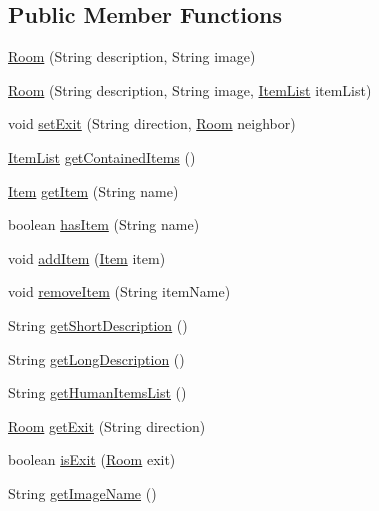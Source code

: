 \subsection*{Public Member Functions}
\begin{DoxyCompactItemize}
\item 
\hyperlink{classpkg__world_1_1Room_ae48ca6830c8c9368ab1cb7e9b006d157}{Room} (String description, String image)
\item 
\hyperlink{classpkg__world_1_1Room_a0f95ea70b403217118bf7d5c1f0aebaf}{Room} (String description, String image, \hyperlink{classpkg__world_1_1ItemList}{Item\-List} item\-List)
\item 
void \hyperlink{classpkg__world_1_1Room_a4a97591f3b574b3d0086843a919a0214}{set\-Exit} (String direction, \hyperlink{classpkg__world_1_1Room}{Room} neighbor)
\item 
\hyperlink{classpkg__world_1_1ItemList}{Item\-List} \hyperlink{classpkg__world_1_1Room_a969205a4d2d2d9e30d1e1db9fc3f0b43}{get\-Contained\-Items} ()
\item 
\hyperlink{classpkg__world_1_1Item}{Item} \hyperlink{classpkg__world_1_1Room_a8624c98bd006830d4484dae2dcd8c8e7}{get\-Item} (String name)
\item 
boolean \hyperlink{classpkg__world_1_1Room_aefa26e1bc5088dd199dde2e9d471c490}{has\-Item} (String name)
\item 
void \hyperlink{classpkg__world_1_1Room_a118585101b274edfdd43b724382de89c}{add\-Item} (\hyperlink{classpkg__world_1_1Item}{Item} item)
\item 
void \hyperlink{classpkg__world_1_1Room_ab84c99b33e69d4a3e0700cab4b9efeaa}{remove\-Item} (String item\-Name)
\item 
String \hyperlink{classpkg__world_1_1Room_adb98ed16e34549faabed35f90673d266}{get\-Short\-Description} ()
\item 
String \hyperlink{classpkg__world_1_1Room_acc8ee9123c9a77428c1e66fbba34aeac}{get\-Long\-Description} ()
\item 
String \hyperlink{classpkg__world_1_1Room_a3ea436ad00d00484b429992ef94535ac}{get\-Human\-Items\-List} ()
\item 
\hyperlink{classpkg__world_1_1Room}{Room} \hyperlink{classpkg__world_1_1Room_ae05ae991a1692ffb29e8aef632d18b95}{get\-Exit} (String direction)
\item 
boolean \hyperlink{classpkg__world_1_1Room_a305aab25719c2b75a0c28c9a53a3c9d3}{is\-Exit} (\hyperlink{classpkg__world_1_1Room}{Room} exit)
\item 
String \hyperlink{classpkg__world_1_1Room_a5d1a496c1fd2e4ba73177e1182c9f4f1}{get\-Image\-Name} ()
\end{DoxyCompactItemize}


